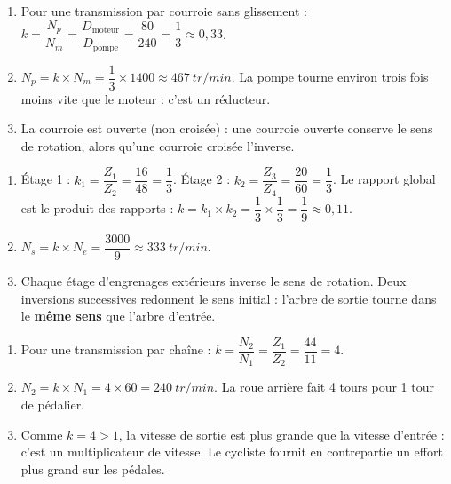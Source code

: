 \documentclass[11pt]{article}
\newcommand{\cle}[1]{{\popxbold\color{popdark}#1}}
\newcounter{popsec}
\newcounter{popsub}
\newcommand{\courssub}[1]{%
  \stepcounter{popsub}%
  \par\vspace{9pt}\noindent{\popxbold\fontsize{11.5}{13}\selectfont\color{popink}{\color{poporange}\thepopsec.\thepopsub}\hspace{6pt}#1}\par\nopagebreak\vspace{4pt}
}
\begin{document}
\courssub{Je m'entraîne}

\begin{corrige}
\begin{enumerate}
\item Pour une transmission par courroie sans glissement : $k = \dfrac{N_p}{N_m} = \dfrac{D_{\text{moteur}}}{D_{\text{pompe}}} = \dfrac{80}{240} = \dfrac{1}{3} \approx 0,33$.
\item $N_p = k \times N_m = \dfrac{1}{3} \times 1400 \approx \SI{467}{tr/min}$. La pompe tourne environ trois fois moins vite que le moteur : c'est un réducteur.
\item La courroie est \cle{ouverte} (non croisée) : une courroie ouverte conserve le sens de rotation, alors qu'une courroie croisée l'inverse.
\end{enumerate}
\end{corrige}

\begin{corrige}
\begin{enumerate}
\item Étage 1 : $k_1 = \dfrac{Z_1}{Z_2} = \dfrac{16}{48} = \dfrac{1}{3}$. Étage 2 : $k_2 = \dfrac{Z_3}{Z_4} = \dfrac{20}{60} = \dfrac{1}{3}$. Le rapport global est le produit des rapports : $k = k_1 \times k_2 = \dfrac{1}{3} \times \dfrac{1}{3} = \dfrac{1}{9} \approx 0,11$.
\item $N_s = k \times N_e = \dfrac{3000}{9} \approx \SI{333}{tr/min}$.
\item Chaque étage d'engrenages extérieurs inverse le sens de rotation. Deux inversions successives redonnent le sens initial : l'arbre de sortie tourne dans le \textbf{même sens} que l'arbre d'entrée.
\end{enumerate}
\end{corrige}

\begin{corrige}
\begin{enumerate}
\item Pour une transmission par chaîne : $k = \dfrac{N_2}{N_1} = \dfrac{Z_1}{Z_2} = \dfrac{44}{11} = 4$.
\item $N_2 = k \times N_1 = 4 \times 60 = \SI{240}{tr/min}$. La roue arrière fait 4 tours pour 1 tour de pédalier.
\item Comme $k = 4 > 1$, la vitesse de sortie est plus grande que la vitesse d'entrée : c'est un \cle{multiplicateur} de vitesse. Le cycliste fournit en contrepartie un effort plus grand sur les pédales.
\end{enumerate}
\end{corrige}
\end{document}
